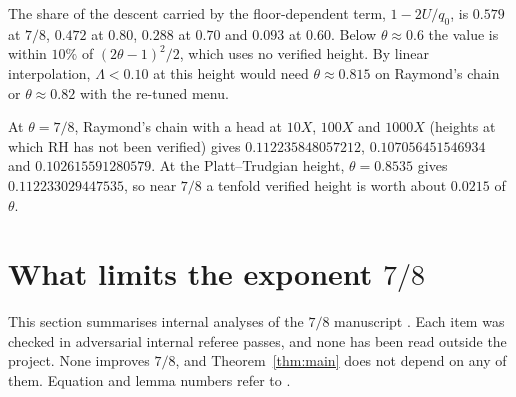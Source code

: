 \documentclass[11pt]{article}
\theoremstyle{definition}
\newcommand{\LB}{\Lambda}
\begin{document}
The share of the descent carried by the floor-dependent term, $1-2U/q_0$, is $0.579$ at
$7/8$, $0.472$ at $0.80$, $0.288$ at $0.70$ and $0.093$ at $0.60$. Below $\theta\approx0.6$ the
value is within $10\%$ of $(2\theta-1)^2/2$, which uses no verified height. By linear
interpolation, $\LB<0.10$ at this height would need $\theta\approx0.815$ on Raymond's chain
or $\theta\approx0.82$ with the re-tuned menu.

At $\theta=7/8$, Raymond's chain with a head at $10X$, $100X$ and $1000X$ (heights at which RH
has not been verified) gives $0.112235848057212$, $0.107056451546934$ and
$0.102615591280579$. At the Platt--Trudgian height, $\theta=0.8535$ gives
$0.112233029447535$, so near $7/8$ a tenfold verified height is worth about $0.0215$ of
$\theta$.

\section{What limits the exponent \texorpdfstring{$7/8$}{7/8}}\label{sec:limits}

This section summarises internal analyses of the $7/8$ manuscript \cite{OpenAI26QRH}
\cite{IntQrhRecords}. Each item was checked in adversarial internal referee passes, and none
has been read outside the project. None improves $7/8$, and Theorem~\ref{thm:main} does not
depend on any of them. Equation and lemma numbers refer to \cite{OpenAI26QRH}.
\end{document}
